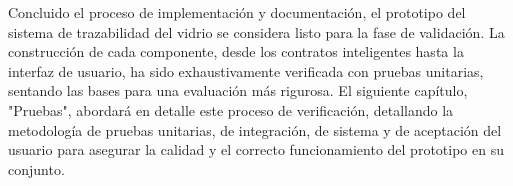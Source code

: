 Concluido el proceso de implementación y documentación, el prototipo del sistema de trazabilidad del vidrio se considera listo para la fase de validación. La construcción de cada componente, desde los contratos inteligentes hasta la interfaz de usuario, ha sido exhaustivamente verificada con pruebas unitarias, sentando las bases para una evaluación más rigurosa. El siguiente capítulo, "Pruebas", abordará en detalle este proceso de verificación, detallando la metodología de pruebas unitarias, de integración, de sistema y de aceptación del usuario para asegurar la calidad y el correcto funcionamiento del prototipo en su conjunto.
